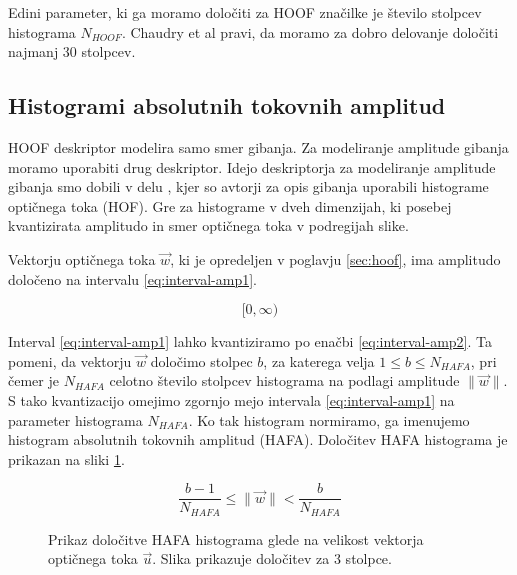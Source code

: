 Edini parameter, ki ga moramo določiti za HOOF značilke je število stolpcev histograma $N_{HOOF}$. Chaudry et al \cite{chaudhry2009histograms} pravi, da moramo za dobro delovanje določiti najmanj $30$ stolpcev. 










\subsection{Histogrami absolutnih tokovnih amplitud}\label{sec:hafa}
HOOF deskriptor modelira samo smer gibanja. Za modeliranje amplitude gibanja moramo uporabiti drug deskriptor. Idejo deskriptorja za modeliranje amplitude gibanja smo dobili v delu \cite{pers2010histograms}, kjer so avtorji za opis gibanja uporabili histograme optičnega toka (HOF). Gre za histograme v dveh dimenzijah, ki posebej kvantizirata amplitudo in smer optičnega toka v podregijah slike. 

Vektorju optičnega toka $\vec{w}$, ki je opredeljen v poglavju \ref{sec:hoof}, ima amplitudo določeno na intervalu \eqref{eq:interval-amp1}. 

\begin{equation}\label{eq:interval-amp1}
	[0, \infty)
\end{equation}


Interval \eqref{eq:interval-amp1} lahko kvantiziramo po enačbi \eqref{eq:interval-amp2}. Ta pomeni, da vektorju $\vec{w}$ določimo stolpec $b$, za katerega velja $1 \leq b \leq N_{HAFA}$, pri čemer je $N_{HAFA}$ celotno število stolpcev histograma na podlagi amplitude $\| \vec{w} \|$. S tako kvantizacijo omejimo zgornjo mejo intervala \eqref{eq:interval-amp1} na parameter histograma $N_{HAFA}$. Ko tak histogram normiramo, ga imenujemo histogram absolutnih tokovnih amplitud (HAFA). Določitev HAFA histograma je prikazan na sliki \ref{fig:hafa-histogram}.

\begin{equation}\label{eq:interval-amp2}
	\frac{b-1}{N_{HAFA}} \leq \| \vec{w} \| < \frac{b}{N_{HAFA}}
\end{equation}




\begin{figure}[htb]
\centering

\caption[Prikaz določitve HAFA histograma glede na velikost vektorja]{Prikaz določitve HAFA histograma glede na velikost vektorja optičnega toka $\vec{u}$. Slika prikazuje določitev za $3$ stolpce.}
\label{fig:hafa-histogram}
\end{figure}


























